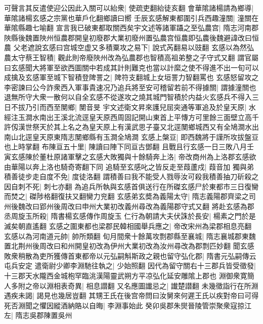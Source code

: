 可聲言其反遣使迎公因此入關可以紿衆|{
	使疏吏翻紿徒亥翻}
會華隂諸楊請為鄉導|{
	華隂諸楊玄感之宗黨也華戶化翻鄉讀曰嚮}
壬辰玄感解東都圍引兵西趣潼關|{
	潼關在華隂縣趣七喻翻}
宣言我已破東都取關西矣宇文述等諸軍躡之至弘農宫|{
	隋志河南郡陜縣後魏置陜州恒農郡開皇初廢郡大業初廢州置弘農宫恒農即弘農後魏避諱改曰恒農}
父老遮說玄感曰宫城空虚又多積粟攻之易下|{
	說式芮翻易以豉翻}
玄感以為然弘農太守蔡王智積|{
	觀此則帝廢陜州改為弘農郡也智積高祖弟整之子守式又翻}
謂官屬曰玄感聞大將軍至欲西圖關中若成其計則難克也當以計縻之使不得進不出一旬可以成擒及玄感軍至城下智積登陴詈之|{
	陴符支翻城上女垣詈力智翻罵也}
玄感怒留攻之李密諫曰公今詐衆西入軍事貴速况乃追兵將至安可稽留若前不得據關|{
	謂據潼關也}
退無所守大衆一散何以自全玄感不從遂攻之燒其城門智積於内益火玄感兵不得入三日不拔乃引而西至閺鄉|{
	閺音旻}
宇文述衛文昇來護兒屈突通等軍追及於皇天原|{
	水經注玉澗水南出王溪北流逕皇天原西周固記開山東首上平慱方可里餘三面壁立高千許仭漢世祭天於其上名之為皇天原上有漢武思子臺又北逕閺鄉城西又有全鳩澗水出南山北逕皇天原東隋志閺鄉縣有玉澗全鳩澗}
玄感上槃豆|{
	即西魏將于謹所攻拔盤豆也上時掌翻}
布陳亘五十里|{
	陳讀曰陣下同亘古鄧翻}
且戰且行玄感一日三敗八月壬寅玄感陳於董杜原諸軍擊之玄感大敗獨與十餘騎奔上洛|{
	帝改商州為上洛郡玄感欲由華陽以奔上洛也騎奇寄翻下同}
追騎至玄感叱之皆反走至葭蘆戍|{
	葭音加}
獨與弟積善徒步走自度不免|{
	度徒洛翻}
謂積善曰我不能受人戮辱汝可殺我積善抽刀斫殺之因自刺不死|{
	刺七亦翻}
為追兵所執與玄感首俱送行在所磔玄感尸於東都市三日復臠而焚之|{
	磔陟格翻復扶又翻臠力兖翻}
玄感弟玄奬為義陽太守|{
	隋志義陽郡齊梁之司州後魏改曰郢州後周改曰申州大業初改義州尋改為義陽郡守式又翻}
將赴玄感為郡丞周旋玉所殺|{
	隋書楊玄感傳作周旋玉}
仁行為朝請大夫伏誅於長安|{
	楊素之門於是滅矣朝直遙翻}
玄感之圍東都也梁郡民韓相國舉兵應之|{
	帝改宋州為梁郡相息亮翻}
玄感以為河南道元帥|{
	帥所類翻}
旬月間衆十餘萬攻剽郡縣至襄城|{
	隋志襄城郡東魏置北荆州後周改曰和州開皇初改為伊州大業初改為汝州尋改為郡剽匹妙翻}
聞玄感敗衆稍散為吏所獲傳首東都帝以元弘嗣斛斯政之親也留守弘化郡|{
	隋書元弘嗣傳云屯兵安定}
遣衛尉少卿李淵馳往執之|{
	少始照翻}
因代為留守關右十三郡兵皆受徵發|{
	十三郡天水隴西金城枹罕臨洮漢陽靈武朔方平凉弘化延安雕隂上郡也}
淵御衆寛簡人多附之帝以淵相表奇異|{
	相息譛翻}
又名應圖䜟忌之|{
	䜟楚譛翻}
未幾徵詣行在所淵遇疾未謁|{
	謁見也幾居豈翻}
其甥王氏在後宫帝問曰汝舅來何遲王氏以疾對帝曰可得死否淵聞之懼因縱酒納賂以自晦|{
	李淵事始此}
癸卯吳郡朱爕晉陵管崇聚衆寇掠江左|{
	隋志吳郡陳置吳州}


